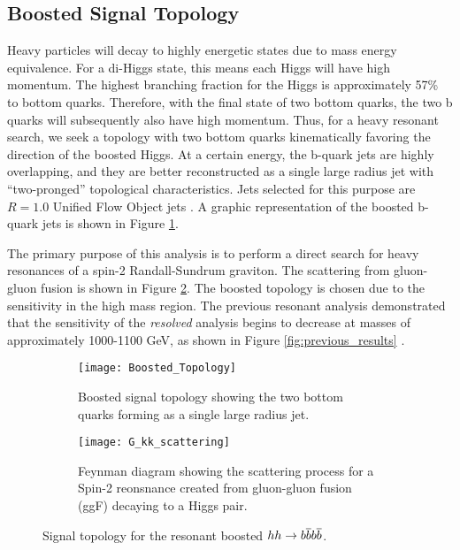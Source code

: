 \documentclass[12pt]{article}
\begin{document}
\subsection{Boosted Signal Topology}
Heavy particles will decay to highly energetic states due to mass energy
equivalence. For a di-Higgs state, this means each Higgs will have high
momentum. The highest branching fraction for the Higgs is approximately 57\% to
bottom quarks. Therefore, with the final state of two bottom quarks, the two b
quarks will subsequently also have high momentum. Thus, for a heavy resonant
search, we seek a topology with two bottom quarks kinematically favoring the
direction of the boosted Higgs. At a certain energy, the b-quark jets are highly
overlapping, and they are better reconstructed as a single large radius jet with
``two-pronged'' topological characteristics. Jets selected for this purpose are
$R=1.0$ Unified Flow Object jets \cite{boosted_hbbcc_tagger, large_r_jet}. A
graphic representation of the boosted b-quark jets is shown in Figure
\ref{subfig:boosted_topology}. 

The primary purpose of this analysis is to perform a direct search for heavy
resonances of a spin-2 Randall-Sundrum graviton. The scattering from gluon-gluon
fusion is shown in Figure \ref{subfig:feynman}. The boosted topology is chosen
due to the sensitivity in the high mass region. The previous resonant analysis
demonstrated that the sensitivity of the \textit{resolved} analysis begins to
decrease at masses of approximately 1000-1100 GeV, as shown in Figure
\ref{fig:previous_results} \cite{atlas_resonant_2022}. 


\begin{figure}[t!]
    \centering
    \begin{subfigure}[t]{.48\textwidth}
        \centering
        \texttt{[image: Boosted\_Topology]}
        \caption{Boosted signal topology showing the two bottom quarks forming as a single large radius jet.}
        \label{subfig:boosted_topology}
    \end{subfigure}
    \hfill
    \begin{subfigure}[t]{.48\textwidth}
        \centering
        \texttt{[image: G\_kk\_scattering]}
        \caption{Feynman diagram showing the scattering process for a Spin-2
        reonsnance created from gluon-gluon fusion (ggF) decaying to a Higgs pair.}
        \label{subfig:feynman}
    \end{subfigure}
    \caption{Signal topology for the resonant boosted $hh\rightarrow b\overline{b}b\overline{b}$.}
\label{fig:signal_topologies}
\end{figure}
\end{document}
